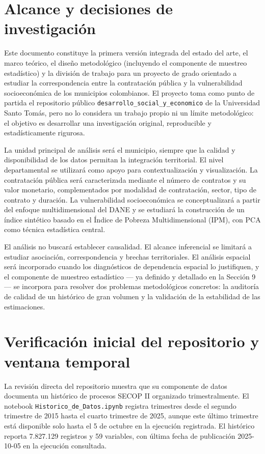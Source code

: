 \documentclass[11pt,letterpaper]{article}
\begin{document}
\section{Alcance y decisiones de investigación}

Este documento constituye la primera versión integrada del estado del arte, el
marco teórico, el diseño metodológico (incluyendo el componente de muestreo
estadístico) y la división de trabajo para un proyecto de grado orientado a
estudiar la correspondencia entre la contratación pública y la vulnerabilidad
socioeconómica de los municipios colombianos. El proyecto toma como punto de
partida el repositorio público \texttt{desarrollo\_social\_y\_economico} de la
Universidad Santo Tomás, pero no lo considera un trabajo propio ni un límite
metodológico: el objetivo es desarrollar una investigación original,
reproducible y estadísticamente rigurosa.

La unidad principal de análisis será el municipio, siempre que la calidad y
disponibilidad de los datos permitan la integración territorial. El nivel
departamental se utilizará como apoyo para contextualización y visualización.
La contratación pública será caracterizada mediante el número de contratos y su
valor monetario, complementados por modalidad de contratación, sector, tipo de
contrato y duración. La vulnerabilidad socioeconómica se conceptualizará a
partir del enfoque multidimensional del DANE y se estudiará la construcción de
un índice sintético basado en el Índice de Pobreza Multidimensional (IPM), con
PCA como técnica estadística central.

El análisis no buscará establecer causalidad. El alcance inferencial se
limitará a estudiar asociación, correspondencia y brechas territoriales. El
análisis espacial será incorporado cuando los diagnósticos de dependencia
espacial lo justifiquen, y el componente de muestreo estadístico --- ya
definido y detallado en la Sección 9 --- se incorpora para resolver dos
problemas metodológicos concretos: la auditoría de calidad de un histórico de
gran volumen y la validación de la estabilidad de las estimaciones.

\section{Verificación inicial del repositorio y ventana temporal}

La revisión directa del repositorio muestra que su componente de datos
documenta un histórico de procesos SECOP II organizado trimestralmente. El
notebook \texttt{Historico\_de\_Datos.ipynb} registra trimestres desde el
segundo trimestre de 2015 hasta el cuarto trimestre de 2025, aunque este último
trimestre está disponible solo hasta el 5 de octubre en la ejecución
registrada. El histórico reporta 7.827.129 registros y 59 variables, con
última fecha de publicación 2025-10-05 en la ejecución consultada.
\end{document}
